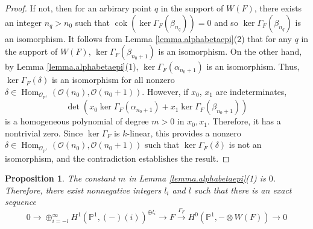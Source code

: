 \documentclass[10pt]{amsart}
\newtheorem{prop}[lemma]{Proposition}
\theoremstyle{definition}
\theoremstyle{remark}
\numberwithin{equation}{section}
\begin{document}
\begin{proof}
If not, then for an arbirary point $q$ in the support of $W(F)$, there exists an integer $n_{q}>n_{0}$ such that $\operatorname{cok }({\operatorname{ker }\Gamma_{F}}(\beta_{n_{q}}))=0$ and so ${\operatorname{ker }\Gamma_{F}}(\beta_{n_{q}})$ is an isomorphism.  It follows from Lemma \ref{lemma.alphabetaepi}(2) that for any $q$ in the support of $W(F)$, ${\operatorname{ker }\Gamma_{F}}(\beta_{n_{0}+1})$ is an isomorphism.  On the other hand, by Lemma \ref{lemma.alphabetaepi}(1), ${\operatorname{ker }\Gamma_{F}}(\alpha_{n_{0}+1})$ is an isomorphism.  Thus, ${\operatorname{ker }\Gamma_{F}}(\delta)$ is an isomorphism for all nonzero $\delta \in \operatorname{Hom}_{\mathcal{O}_{\mathbb{P}^{1}}}(\mathcal{O}(n_{0}),\mathcal{O}(n_{0}+1))$.  However, if $x_{0}$, $x_{1}$ are indeterminates,
$$
\operatorname{det }(x_{0}{\operatorname{ker }\Gamma_{F}}(\alpha_{n_{0}+1})+x_{1}{\operatorname{ker }\Gamma_{F}}(\beta_{n_{0}+1}))
$$
is a homogeneous polynomial of degree $m>0$ in $x_{0},x_{1}$.  Therefore, it has a nontrivial zero.  Since ${\operatorname{ker }\Gamma_{F}}$ is $k$-linear, this provides a nonzero $\delta  \in \operatorname{Hom}_{\mathcal{O}_{\mathbb{P}^{1}}}(\mathcal{O}(n_{0}),\mathcal{O}(n_{0}+1))$ such that ${\operatorname{ker }\Gamma_{F}}(\delta)$ is not an isomorphism, and the contradiction establishes the result.
\end{proof}

\begin{prop} \label{prop.m}
The constant $m$ in Lemma \ref{lemma.alphabetaepi}(1) is $0$.  Therefore, there exist nonnegative integers $l_{i}$ and $l$ such that there is an exact sequence
\begin{equation} \label{eqn.finalses}
0 \rightarrow \oplus_{i=-l}^\infty {H}^{1}(\mathbb{P}^{1},(-)(i))^{\oplus l_{i}} \rightarrow F \overset{\Gamma_{F}}{\rightarrow} H^{0}(\mathbb{P}^{1},-\otimes W(F)) \rightarrow 0
\end{equation}
\end{prop}
\end{document}
